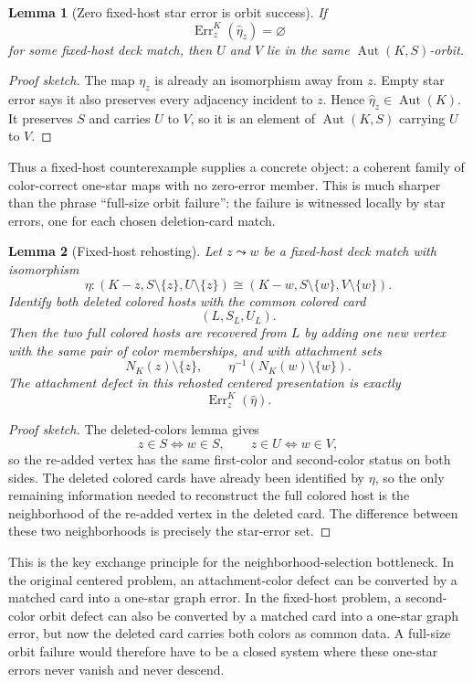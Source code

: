 \documentclass[11pt]{article}
\newtheorem{lemma}{Lemma}
\newcommand{\Aut}{\operatorname{Aut}}
\newcommand{\Err}{\operatorname{Err}}
\begin{document}
\begin{lemma}[Zero fixed-host star error is orbit success]
If
\[
  \Err^{K}_z(\widehat\eta_z)=\varnothing
\]
for some fixed-host deck match, then \(U\) and \(V\) lie in the same
\(\Aut(K,S)\)-orbit.
\end{lemma}

\begin{proof}[Proof sketch]
The map \(\eta_z\) is already an isomorphism away from \(z\).  Empty star
error says it also preserves every adjacency incident to \(z\).  Hence
\(\widehat\eta_z\in\Aut(K)\).  It preserves \(S\) and carries \(U\) to \(V\),
so it is an element of \(\Aut(K,S)\) carrying \(U\) to \(V\).
\end{proof}

Thus a fixed-host counterexample supplies a concrete object: a coherent family
of color-correct one-star maps with no zero-error member.  This is much
sharper than the phrase ``full-size orbit failure'': the failure is witnessed
locally by star errors, one for each chosen deletion-card match.

\begin{lemma}[Fixed-host rehosting]
Let \(z\leadsto w\) be a fixed-host deck match with isomorphism
\[
  \eta:(K-z,S\setminus\{z\},U\setminus\{z\})
  \cong
  (K-w,S\setminus\{w\},V\setminus\{w\}).
\]
Identify both deleted colored hosts with the common colored card
\[
  (L,S_L,U_L).
\]
Then the two full colored hosts are recovered from \(L\) by adding one new
vertex with the same pair of color memberships, and with attachment sets
\[
  N_K(z)\setminus\{z\},
  \qquad
  \eta^{-1}(N_K(w)\setminus\{w\}).
\]
The attachment defect in this rehosted centered presentation is exactly
\[
  \Err^K_z(\widehat\eta).
\]
\end{lemma}

\begin{proof}[Proof sketch]
The deleted-colors lemma gives
\[
  z\in S \Longleftrightarrow w\in S,
  \qquad
  z\in U \Longleftrightarrow w\in V,
\]
so the re-added vertex has the same first-color and second-color status on
both sides.  The deleted colored cards have already been identified by
\(\eta\), so the only remaining information needed to reconstruct the full
colored host is the neighborhood of the re-added vertex in the deleted card.
The difference between these two neighborhoods is precisely the star-error
set.
\end{proof}

This is the key exchange principle for the neighborhood-selection bottleneck.
In the original centered problem, an attachment-color defect can be converted
by a matched card into a one-star graph error.  In the fixed-host problem, a
second-color orbit defect can also be converted by a matched card into a
one-star graph error, but now the deleted card carries both colors as common
data.  A full-size orbit failure would therefore have to be a closed system
where these one-star errors never vanish and never descend.
\end{document}
